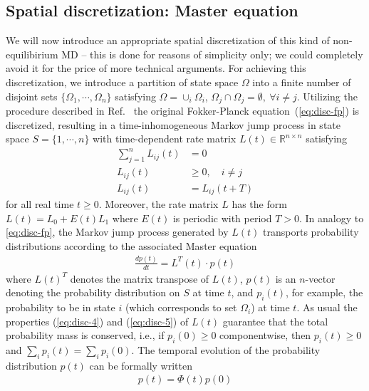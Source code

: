 \documentclass[aps, pre, preprint,unsortedaddress,a4paper,onecolumn]{revtex4}
\newcommand{\vect}[1]{#1}
\newcommand{\myphi}{\Phi}
\begin{document}
\subsection{Spatial discretization: Master equation}
We will now introduce an appropriate spatial discretization of this kind of non-equilibirium MD -- this is done for reasons of simplicity only; we could completely avoid it for the price of more technical arguments.
For achieving this discretization, we 
introduce a partition of state space $\Omega$ into a finite number of disjoint
sets $\{ \Omega_1, \cdots, \Omega_n\}$ satisfying $\Omega = \cup_i \Omega_i$,
$\Omega_j\cap \Omega_j = \emptyset,\ \forall i\neq j$.
Utilizing the procedure described in Ref.~\cite{latorre2011structure} the original Fokker-Planck equation~(\ref{eq:disc-fp})
is discretized, resulting in a time-inhomogeneous Markov jump process in state
space $S = \{1, \cdots, n\}$ with time-dependent rate
matrix $\vect L(t) \in \mathbb R^{n\times n}$ satisfying
\begin{align}\label{eq:disc-4}
\sum\limits_{j=1}^n L_{ij}(t) & =  0\\ \label{eq:disc-5}
L_{ij}(t) & \ge  0, \quad i\not= j\\
L_{ij}(t) & =  L_{ij}(t+T)
\end{align}
for all real time $t\geq 0$.
Moreover, the rate matrix $L$ has the form $\vect L(t)=\vect L_0+E(t)\vect L_1$
where $E(t)$ is periodic with period $T>0$.
In analogy to \eqref{eq:disc-fp}, the Markov jump process generated by
$\vect L(t)$ transports probability distributions according to the associated Master equation
\begin{align}
  \label{eq:disc-master}
  \frac{d\vect p(t)}{dt} = \vect L^T(t)\cdot \vect p(t)
\end{align}
where $\vect L(t)^T$ denotes the matrix transpose of $\vect L(t)$, $\vect p(t)$ is an $n$-vector denoting the probability distribution on $S$ at time $t$, and
$p_i(t)$, for example, the probability to be in state $i$ (which corresponds to set $\Omega_i$) at time $t$.
As usual the properties (\ref{eq:disc-4}) and (\ref{eq:disc-5}) of
$\vect L(t)$ guarantee that the total probability mass is conserved,
i.e., if $p_i(0)\ge 0$ componentwise, then $p_i(t)\ge 0$ and $\sum_i
p_i(t) = \sum_ip_i(0)$.
The temporal evolution of the probability distribution $\vect p(t)$ can be formally written
\begin{align}  \label{eq:disc-8}
\vect p(t)=\myphi(t)\vect p(0)
\end{align}
\end{document}
